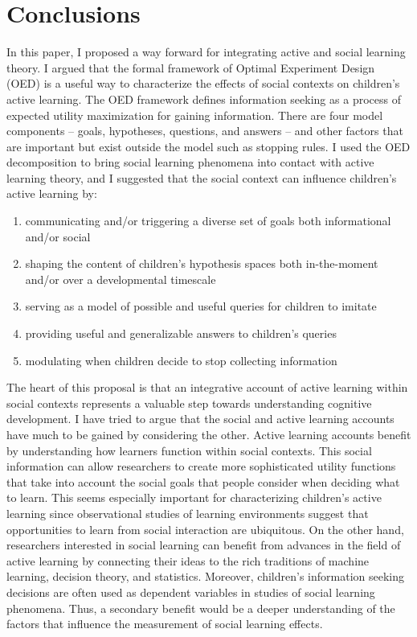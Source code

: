 \documentclass[english,floatsintext,man]{apa6}
\providecommand{\tightlist}{%
  \setlength{\itemsep}{0pt}\setlength{\parskip}{0pt}}
\theoremstyle{definition}
\theoremstyle{definition}
\theoremstyle{definition}
\theoremstyle{remark}
\begin{document}
\section{Conclusions}\label{conclusions}

In this paper, I proposed a way forward for integrating active and
social learning theory. I argued that the formal framework of Optimal
Experiment Design (OED) is a useful way to characterize the effects of
social contexts on children's active learning. The OED framework defines
information seeking as a process of expected utility maximization for
gaining information. There are four model components -- goals,
hypotheses, questions, and answers -- and other factors that are
important but exist outside the model such as stopping rules. I used the
OED decomposition to bring social learning phenomena into contact with
active learning theory, and I suggested that the social context can
influence children's active learning by:

\begin{enumerate}
\def\labelenumi{\arabic{enumi}.}
\tightlist
\item
  communicating and/or triggering a diverse set of goals both
  informational and/or social
\item
  shaping the content of children's hypothesis spaces both in-the-moment
  and/or over a developmental timescale
\item
  serving as a model of possible and useful queries for children to
  imitate
\item
  providing useful and generalizable answers to children's queries
\item
  modulating when children decide to stop collecting information
\end{enumerate}

The heart of this proposal is that an integrative account of active
learning within social contexts represents a valuable step towards
understanding cognitive development. I have tried to argue that the
social and active learning accounts have much to be gained by
considering the other. Active learning accounts benefit by understanding
how learners function within social contexts. This social information
can allow researchers to create more sophisticated utility functions
that take into account the social goals that people consider when
deciding what to learn. This seems especially important for
characterizing children's active learning since observational studies of
learning environments suggest that opportunities to learn from social
interaction are ubiquitous. On the other hand, researchers interested in
social learning can benefit from advances in the field of active
learning by connecting their ideas to the rich traditions of machine
learning, decision theory, and statistics. Moreover, children's
information seeking decisions are often used as dependent variables in
studies of social learning phenomena. Thus, a secondary benefit would be
a deeper understanding of the factors that influence the measurement of
social learning effects.
\end{document}
